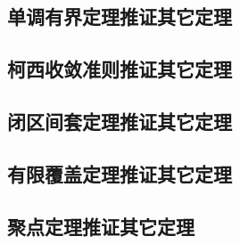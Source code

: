 \subsection{单调有界定理推证其它定理}

\subsection{柯西收敛准则推证其它定理}

\subsection{闭区间套定理推证其它定理}

\subsection{有限覆盖定理推证其它定理}

\subsection{聚点定理推证其它定理}





